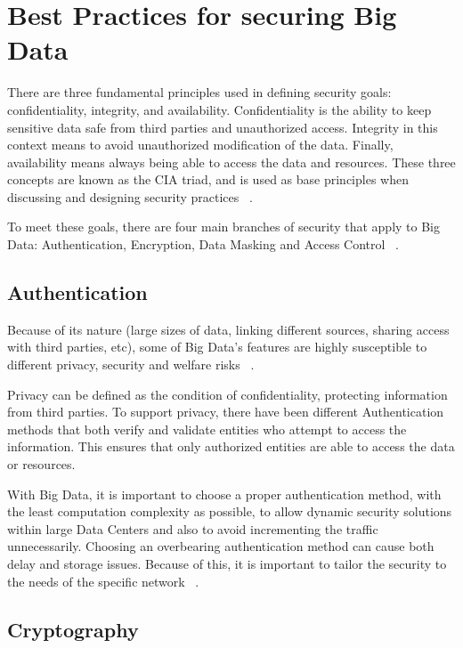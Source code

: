 \documentclass[sigconf]{acmart}
\begin{document}
\section{Best Practices for securing Big Data}
There are three fundamental principles used in defining security goals: confidentiality, integrity, and availability.  Confidentiality is the ability to keep sensitive data safe from third parties and unauthorized access. Integrity in this context means to avoid unauthorized modification of the data. Finally, availability means always being able to access the data and resources. These three concepts are known as the CIA triad, and is used as base principles when discussing and designing security practices ~\cite{hamlin2016cryptography}.

To meet these goals, there are four main branches of security that apply to Big Data: Authentication, Encryption, Data Masking and Access Control ~\cite{abouelmehdi201773}.

\subsection{Authentication}

Because of its nature (large sizes of data, linking different sources, sharing access with third parties, etc), some of Big Data's features are highly susceptible to different privacy, security and welfare risks ~\cite{kshetri2014big}.

Privacy can be defined as the condition of confidentiality, protecting information from third parties. To support privacy, there have been different Authentication methods that both verify and validate entities who attempt to access the information. This ensures that only authorized entities are able to access the data or resources. 

With Big Data, it is important to choose a proper authentication method, with the least computation complexity as possible, to allow dynamic security solutions within large Data Centers and also to avoid incrementing the traffic unnecessarily.  Choosing an overbearing authentication method can cause both delay and storage issues.  Because of this, it is important to tailor the security to the needs of the specific network ~\cite{Thayananthan2015big}.

\subsection{Cryptography}
\end{document}
